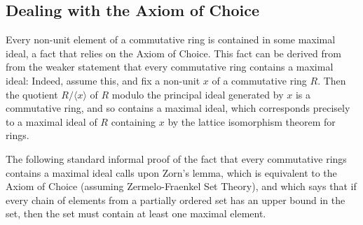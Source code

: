 \documentclass[referee,sn-mathphys]{sn-jnl}
\theoremstyle{definition}
\theoremstyle{remark}
\numberwithin{equation}{section}
\numberwithin{figure}{subsection}
\begin{document}
\subsection{Dealing with the Axiom of Choice}

Every non-unit element of a commutative ring is contained in some maximal
ideal, a fact that relies on the Axiom of Choice. 
This fact can be derived from from the weaker statement that every commutative ring contains a maximal ideal:
Indeed, assume this, and fix a non-unit $x$ of a commutative ring $R$.  Then the quotient $R/\langle x \rangle$ of $R$ modulo 
the principal ideal generated by $x$ is a commutative ring, and so contains a maximal ideal, which corresponds precisely to a 
maximal ideal of $R$ containing $x$ by   
the lattice isomorphism theorem for rings. 

The following standard informal proof of the fact that every commutative rings contains a maximal ideal calls upon Zorn's lemma, 
which is equivalent to the Axiom of Choice (assuming Zermelo-Fraenkel Set Theory), and which 
says that if every chain of elements from a partially ordered set  has an upper
bound in the set, then the set must contain at least one maximal element. 
\end{document}
